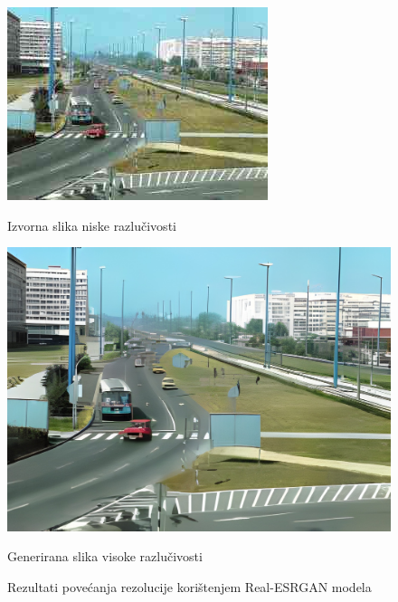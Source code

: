 \documentclass[times, utf8, seminar, numeric]{fer}
\begin{document}
	\begin{figure}[H]
		\centering
		\begin{minipage}{0.45\textwidth}
			\centering
			\includegraphics[width=\linewidth]{images/experiment/superresolution/zagreb.jpg}
			\caption*{Izvorna slika niske razlučivosti}
		\end{minipage}
		\hfill
		\begin{minipage}{0.45\textwidth}
			\centering
			\includegraphics[width=\linewidth]{images/experiment/superresolution/zagreb_out.jpg}
			\caption*{Generirana slika visoke razlučivosti}
		\end{minipage}
		\caption{Rezultati povećanja rezolucije korištenjem Real-ESRGAN modela}
		\label{fig:real_esrgan_result}
	\end{figure}
	
\end{document}

